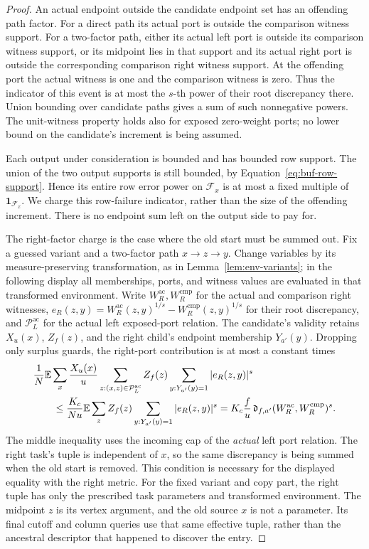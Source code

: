 \begin{proof}
An actual endpoint outside the candidate endpoint set has an offending path factor.
For a direct path its actual port is outside the comparison witness support.
For a two-factor path, either its actual left port is outside its comparison
witness support, or its midpoint lies in that support and its actual
right port is outside the corresponding comparison right witness support.
At the offending port the actual witness is one and the comparison witness
is zero.  Thus the indicator of this event is at most the $s$-th power
of their root discrepancy there.  Union bounding over candidate paths
gives a sum of such nonnegative powers.  The unit-witness property holds
also for exposed zero-weight ports; no lower bound on the candidate's
increment is being assumed.

Each output under consideration is bounded and has bounded row support.
The union of the two output supports is still bounded, by
Equation~\eqref{eq:buf-row-support}.  Hence its entire row error power on
$\mathcal F_x$ is at most a fixed multiple of
$\mathbf1_{\mathcal F_x}$.  We charge this row-failure indicator, rather
than the size of the offending increment.  There is no endpoint sum left
on the output side to pay for.

The right-factor charge is the case where the old start must be summed
out.  Fix a guessed variant and a two-factor path $x\to z\to y$.
Change variables by its measure-preserving transformation, as in
Lemma~\ref{lem:env-variants}; in the following display all memberships,
ports, and witness values are evaluated in that transformed environment.
Write $W_R^{\mathrm{ac}},W_R^{\mathrm{cmp}}$ for the actual and comparison right
witnesses, $e_R(z,y)=W_R^{\mathrm{ac}}(z,y)^{1/s}-W_R^{\mathrm{cmp}}(z,y)^{1/s}$
for their root discrepancy, and $\mathcal P^{\mathrm{ac}}_L$ for the actual
left exposed-port relation.
The candidate's validity retains $X_u(x)$, $Z_f(z)$, and the right
child's endpoint membership $Y_{a'}(y)$.  Dropping only surplus guards,
the right-port contribution is at most a constant times
\begin{align}
 &\frac1N\mathbb E\sum_x\frac{X_u(x)}u
       \sum_{z:(x,z)\in\mathcal P^{\mathrm{ac}}_L}Z_f(z)
       \sum_{y:Y_{a'}(y)=1}|e_R(z,y)|^s \notag\\
 &\qquad\le\frac{K_c}{N u}\mathbb E\sum_z Z_f(z)
       \sum_{y:Y_{a'}(y)=1}|e_R(z,y)|^s
   =K_c\frac f u\,\mathfrak d_{f,a'}(W_R^{\mathrm{ac}},
                                      W_R^{\mathrm{cmp}})^s.
 \label{eq:fp-actual-incoming}
\end{align}
The middle inequality uses the incoming cap of the \emph{actual} left
port relation.  The right task's
tuple is independent of $x$, so the same discrepancy is being summed
when the old start is removed.  This condition is necessary for the
displayed equality with the right metric.
For the fixed variant and copy part, the right tuple has only the
prescribed task parameters and transformed environment.  The midpoint
$z$ is its vertex argument, and the old source $x$ is not a parameter.
Its final cutoff and column queries use that same effective tuple, rather
than the ancestral descriptor that happened to discover the entry.


\end{proof}
